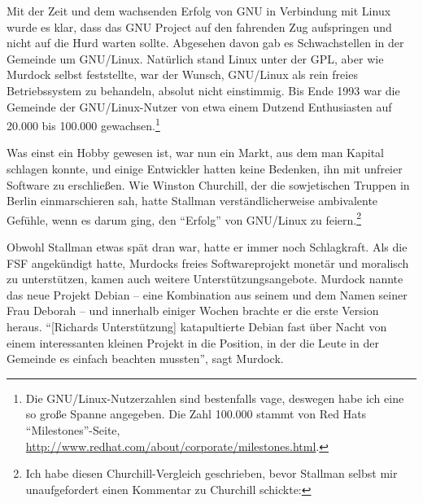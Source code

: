 Mit der Zeit und dem wachsenden Erfolg von GNU in Verbindung mit Linux wurde es klar, dass das GNU Project auf den fahrenden Zug aufspringen und nicht auf die Hurd warten sollte. Abgesehen davon gab es Schwachstellen in der Gemeinde um GNU/Linux. Natürlich stand Linux unter der GPL, aber wie Murdock selbst feststellte, war der Wunsch, GNU/Linux als rein freies Betriebssystem zu behandeln, absolut nicht einstimmig. Bis Ende 1993 war die Gemeinde der GNU/Linux-Nutzer von etwa einem Dutzend Enthusiasten auf 20.000 bis 100.000 gewachsen.\footnote{Die GNU/Linux-Nutzerzahlen sind bestenfalls vage, deswegen habe ich eine so große Spanne angegeben. Die Zahl 100.000 stammt von Red Hats "`Milestones"'-Seite, \url{http://www.redhat.com/about/corporate/milestones.html}.}

Was einst ein Hobby gewesen ist, war nun ein Markt, aus dem man Kapital schlagen konnte, und einige Entwickler hatten keine Bedenken, ihn mit unfreier Software zu erschließen. Wie Winston Churchill, der die sowjetischen Truppen in Berlin einmarschieren sah, hatte Stallman verständlicherweise ambivalente Gefühle, wenn es darum ging, den "`Erfolg"' von GNU/Linux zu feiern.\footnote{Ich habe diesen Churchill-Vergleich geschrieben, bevor Stallman selbst mir unaufgefordert einen Kommentar zu Churchill schickte:
}

Obwohl Stallman etwas spät dran war, hatte er immer noch Schlagkraft. Als die FSF angekündigt hatte, Murdocks freies Softwareprojekt monetär und moralisch zu unterstützen, kamen auch weitere Unterstützungsangebote. Murdock nannte das neue Projekt Debian – eine Kombination aus seinem und dem Namen seiner Frau Deborah – und innerhalb einiger Wochen brachte er die erste Version heraus. "`[Richards Unterstützung] katapultierte Debian fast über Nacht von einem interessanten kleinen Projekt in die Position, in der die Leute in der Gemeinde es einfach beachten mussten"', sagt Murdock.

